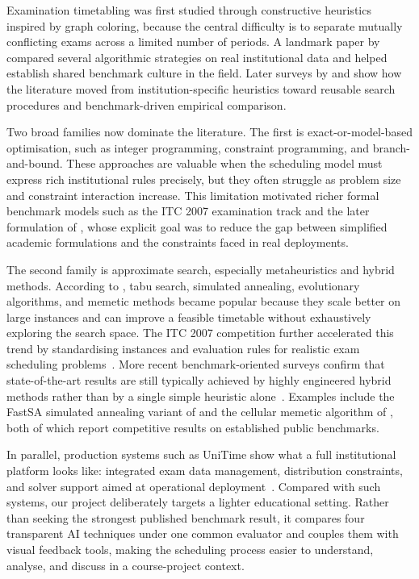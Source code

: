 Examination timetabling was first studied through constructive
heuristics inspired by graph coloring, because the central difficulty is
to separate mutually conflicting exams across a limited number of
periods. A landmark paper by \textcite{carter1996} compared several
algorithmic strategies on real institutional data and helped establish
shared benchmark culture in the field. Later surveys by
\textcite{burke2002} and \textcite{qu2009} show how the literature moved
from institution-specific heuristics toward reusable search procedures
and benchmark-driven empirical comparison.

Two broad families now dominate the literature. The first is
exact-or-model-based optimisation, such as integer programming,
constraint programming, and branch-and-bound. These approaches are
valuable when the scheduling model must express rich institutional rules
precisely, but they often struggle as problem size and constraint
interaction increase. This limitation motivated richer formal benchmark
models such as the ITC 2007 examination track and the later formulation
of \textcite{mccollum2012}, whose explicit goal was to reduce the gap
between simplified academic formulations and the constraints faced in
real deployments.

The second family is approximate search, especially metaheuristics and
hybrid methods. According to \textcite{qu2009}, tabu search, simulated
annealing, evolutionary algorithms, and memetic methods became popular
because they scale better on large instances and can improve a feasible
timetable without exhaustively exploring the search space. The ITC 2007
competition further accelerated this trend by standardising instances
and evaluation rules for realistic exam scheduling
problems~\parencite{mccollum2007}. More recent benchmark-oriented
surveys confirm that state-of-the-art results are still typically
achieved by highly engineered hybrid methods rather than by a single
simple heuristic alone~\parencite{ceschia2023}. Examples include the
FastSA simulated annealing variant of \textcite{leite2019} and the
cellular memetic algorithm of \textcite{leite2018}, both of which
report competitive results on established public benchmarks.

In parallel, production systems such as UniTime show what a full
institutional platform looks like: integrated exam data management,
distribution constraints, and solver support aimed at operational
deployment~\parencite{unitime2026}. Compared with such systems, our
project deliberately targets a lighter educational setting. Rather than
seeking the strongest published benchmark result, it compares four
transparent AI techniques under one common evaluator and couples them
with visual feedback tools, making the scheduling process easier to
understand, analyse, and discuss in a course-project context.

